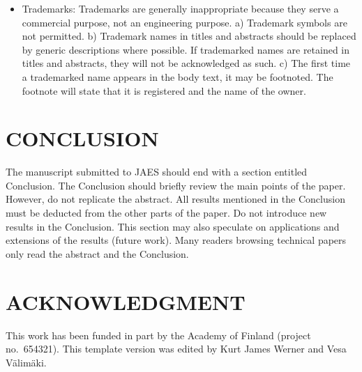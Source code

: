 \documentclass[fleqn]{jaes}
\begin{document}
\begin{itemize}
    \item Trademarks: Trademarks are generally inappropriate because they serve a commercial purpose, not an engineering purpose. a) Trademark symbols are not permitted. b) Trademark names in titles and abstracts should be replaced by generic descriptions where possible. If trademarked names are retained in titles and abstracts, they will not be acknowledged as such. c) The first time a trademarked name appears in the body text, it may be footnoted. The footnote will state that it is registered and the name of the owner.
\end{itemize}

\section{CONCLUSION}
The manuscript submitted to JAES should end with a section entitled Conclusion. The Conclusion should briefly review the main points of the paper. However, do not replicate the abstract. All results mentioned in the Conclusion must be deducted from the other parts of the paper. Do not introduce new results in the Conclusion. This section may also speculate on applications and extensions of the results (future work). Many readers browsing technical papers only read the abstract and the Conclusion.

\section{ACKNOWLEDGMENT}
This  work  has  been  funded  in  part  by  the  Academy of   Finland   (project no.~654321). This template version was edited by Kurt James Werner and Vesa V\"alim\"aki. 

%
%
\end{document}
